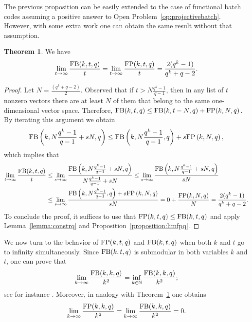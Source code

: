 \documentclass[11pt,a4paper]{article}
\theoremstyle{definition}
\newtheorem{theorem}{Theorem}[section]
\newcommand{\N}{\mathbb N}
\newcommand{\fb}{\textnormal{FB}}
\newcommand{\fp}{\textnormal{FP}}
\begin{document}
The previous proposition can be easily extended to the case of functional batch codes assuming a positive answer to Open Problem~\ref{op:projectivebatch}. However, with some extra work one can obtain the same result without that assumption.
\begin{theorem}\label{theorem:ttoinfinity}
We have
    \begin{equation*}
         \lim_{t\to\infty}\frac{\fb(k,t,q)}{t}=\lim_{t\to\infty}\frac{\fp(k,t,q)}{t}=\frac{2(q^{k}-1)}{q^k+q-2}.
    \end{equation*}
\end{theorem}
\begin{proof}
    Let $N=\frac{(q^k+q-2)}{2}$. Observed that if $t>N\frac{q^k-1}{q-1}$, then in any list of $t$ nonzero vectors there are at least $N$ of them that belong to the same one-dimensional vector space. Therefore, $\fb(k,t,q)\leq \fb(k,t-N,q)+\fp(k,N,q)$. By iterating this argument we obtain
    \begin{equation*}
        \fb\left(k,N\frac{q^k-1}{q-1}+sN,q\right)\leq\fb\left(k,N\frac{q^k-1}{q-1},q\right)+s\fp\left(k,N,q\right),
    \end{equation*}
    which implies that
    \begin{equation*}
        \begin{split}
            \lim_{t\to\infty}\frac{\fb(k,t,q)}{t}&\leq\lim_{s\to\infty}\frac{\fb\left(k,N\frac{q^k-1}{q-1}+sN,q\right)}{N\frac{q^k-1}{q-1}+sN}\leq\lim_{s\to\infty}\frac{\fb\left(k,N\frac{q^k-1}{q-1}+sN,q\right)}{sN}\\
            &\leq\lim_{s\to\infty} \frac{\fb\left(k,N\frac{q^k-1}{q-1},q\right)+s\fp\left(k,N,q\right)}{sN}=0+\frac{\fp(k,N,q)}{N}=\frac{2(q^{k}-1)}{q^k+q-2}.
        \end{split}
    \end{equation*}
    To conclude the proof, it suffices to use that $\fp(k,t,q)\leq\fb(k,t,q)$ and 
    apply Lemma~\ref{lemma:constrq} and Proposition~\ref{proposition:limfpq}.
\end{proof}

We now turn to the behavior of $\fp(k,t,q)$ and $\fb(k,t,q)$ when both $k$ and $t$ go to infinity simultaneously. Since $\fb(k,t,q)$ is submodular in both variables $k$ and $t$, one can prove that
\begin{equation*}        \lim_{k\to\infty}\frac{\fb(k,k,q)}{k^2}=\inf_{k\in\N}\frac{\fb(k,k,q)}{k^2};
\end{equation*}
 see for instance \cite{capobianco2008multidimensional}. Moreover, in analogy with 
 Theorem~\ref{theorem:ttoinfinity} one obtains
\begin{equation}\label{equation:limit}
     \lim_{k\to \infty}\frac{\fp(k,k,q)}{k^2}=\lim_{k\to \infty}\frac{\fb(k,k,q)}{k^2}=0.
\end{equation} 
\end{document}
